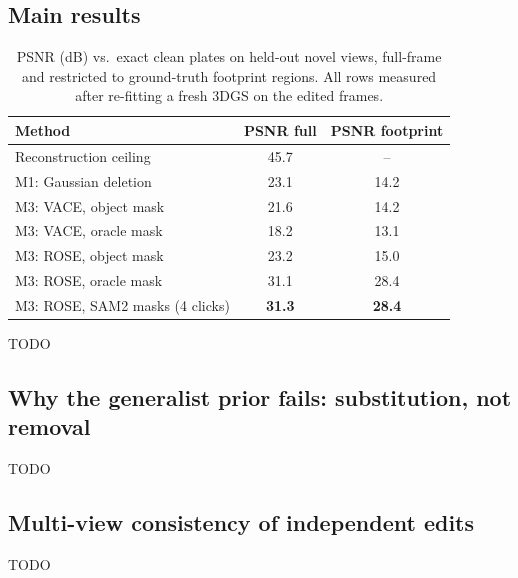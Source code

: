 \documentclass[11pt]{article}
\begin{document}
\subsection{Main results}
\begin{table}[h]
\centering
\begin{tabular}{lcc}
\toprule
Method & PSNR full & PSNR footprint \\
\midrule
Reconstruction ceiling            & 45.7 & --   \\
M1: Gaussian deletion             & 23.1 & 14.2 \\
M3: VACE, object mask             & 21.6 & 14.2 \\
M3: VACE, oracle mask             & 18.2 & 13.1 \\
M3: ROSE, object mask             & 23.2 & 15.0 \\
M3: ROSE, oracle mask             & 31.1 & 28.4 \\
M3: ROSE, SAM2 masks (4 clicks)   & \textbf{31.3} & \textbf{28.4} \\
\bottomrule
\end{tabular}
\caption{PSNR (dB) vs.\ exact clean plates on held-out novel views, full-frame
and restricted to ground-truth footprint regions. All rows measured after
re-fitting a fresh 3DGS on the edited frames.}
\end{table}
TODO

\subsection{Why the generalist prior fails: substitution, not removal}
TODO

\subsection{Multi-view consistency of independent edits}
TODO
\end{document}
